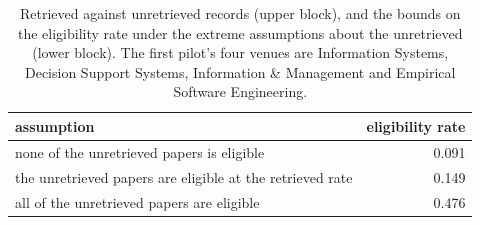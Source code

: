 \begin{table}[t]
\centering
\small
{}
\par\medskip
\begin{tabular}{lr}
\toprule
assumption & eligibility rate \\
\midrule
none of the unretrieved papers is eligible & 0.091 \\
the unretrieved papers are eligible at the retrieved rate & 0.149 \\
all of the unretrieved papers are eligible & 0.476 \\
\bottomrule
\end{tabular}
\caption{Retrieved against unretrieved records (upper block), and the bounds on the eligibility rate under the extreme assumptions about the unretrieved (lower block). The first pilot's four venues are Information Systems, Decision Support Systems, Information \& Management and Empirical Software Engineering.}
\label{tab:missing}
\end{table}
